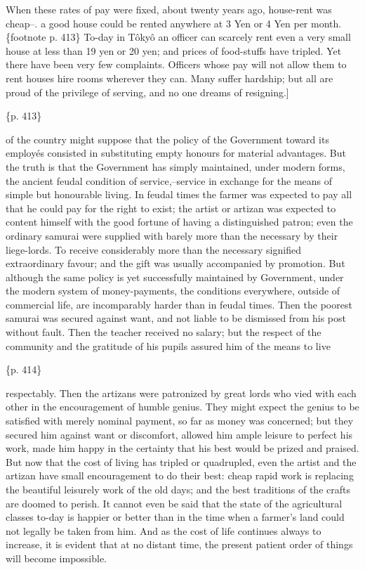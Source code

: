 When these rates of pay were fixed, about twenty years ago, house-rent was cheap--. a good house could be rented anywhere at 3 Yen or 4 Yen per month. \{footnote p. 413\} To-day in Tôkyô an officer can scarcely rent even a very small house at less than 19 yen or 20 yen; and prices of food-stuffs have tripled. Yet there have been very few complaints. Officers whose pay will not allow them to rent houses hire rooms wherever they can. Many suffer hardship; but all are proud of the privilege of serving, and no one dreams of resigning.]

\{p. 413\}

of the country might suppose that the policy of the Government toward its employés consisted in substituting empty honours for material advantages. But the truth is that the Government has simply maintained, under modern forms, the ancient feudal condition of service,--service in exchange for the means of simple but honourable living. In feudal times the farmer was expected to pay all that he could pay for the right to exist; the artist or artizan was expected to content himself with the good fortune of having a distinguished patron; even the ordinary samurai were supplied with barely more than the necessary by their liege-lords. To receive considerably more than the necessary signified extraordinary favour; and the gift was usually accompanied by promotion. But although the same policy is yet successfully maintained by Government, under the modern system of money-payments, the conditions everywhere, outside of commercial life, are incomparably harder than in feudal times. Then the poorest samurai was secured against want, and not liable to be dismissed from his post without fault. Then the teacher received no salary; but the respect of the community and the gratitude of his pupils assured him of the means to live

\{p. 414\}

respectably. Then the artizans were patronized by great lords who vied with each other in the encouragement of humble genius. They might expect the genius to be satisfied with merely nominal payment, so far as money was concerned; but they secured him against want or discomfort, allowed him ample leisure to perfect his work, made him happy in the certainty that his best would be prized and praised. But now that the cost of living has tripled or quadrupled, even the artist and the artizan have small encouragement to do their best: cheap rapid work is replacing the beautiful leisurely work of the old days; and the best traditions of the crafts are doomed to perish. It cannot even be said that the state of the agricultural classes to-day is happier or better than in the time when a farmer's land could not legally be taken from him. And as the cost of life continues always to increase, it is evident that at no distant time, the present patient order of things will become impossible.

